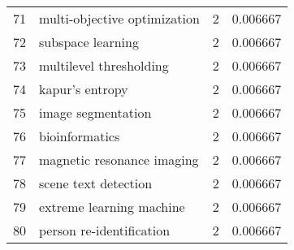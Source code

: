 \begin{tabular}{llrr}
71 &       multi-objective optimization &           2 &    0.006667 \\
72 &                  subspace learning &           2 &    0.006667 \\
73 &            multilevel thresholding &           2 &    0.006667 \\
74 &                    kapur's entropy &           2 &    0.006667 \\
75 &                 image segmentation &           2 &    0.006667 \\
76 &                     bioinformatics &           2 &    0.006667 \\
77 &         magnetic resonance imaging &           2 &    0.006667 \\
78 &               scene text detection &           2 &    0.006667 \\
79 &           extreme learning machine &           2 &    0.006667 \\
80 &           person re-identification &           2 &    0.006667 \\
\bottomrule
\end{tabular}
